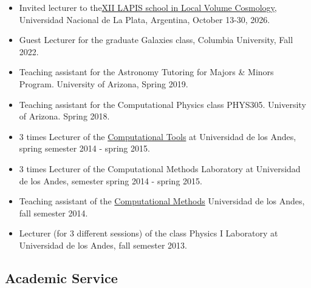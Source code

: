 \documentclass[14pt]{article}
\begin{document}
\begin{itemize}
  \setlength\itemsep{0.0em}
  \renewcommand\labelitemi{$\cdot$}
  \item Invited lecturer to the\href{https://congresos.unlp.edu.ar/xiilapis2026/home/}{XII LAPIS school in
    Local Volume Cosmology}, Universidad Nacional de La Plata, Argentina, October 13-30, 2026. 
\item Guest Lecturer for the graduate Galaxies class, Columbia University, Fall 2022.
\item Teaching assistant for the Astronomy Tutoring for Majors \& Minors Program. University of Arizona, Spring 2019. 
\item Teaching assistant for the Computational Physics class PHYS305. University of Arizona. Spring 2018.
\item 3 times Lecturer of the \href{https://github.com/ComputoCienciasUniandes/HerramientasComputacionales}{Computational
  Tools} at Universidad de los Andes, spring semester 2014 - spring 2015.
\item 3 times Lecturer of the Computational Methods Laboratory at Universidad de los Andes, semester spring 2014 - spring 2015.
\item Teaching assistant of the
  \href{https://github.com/ComputoCienciasUniandes/MetodosComputacionales}{Computational
  Methods} Universidad de los Andes, fall semester 2014.
\item Lecturer (for 3 different sessions) of the class Physics I Laboratory at Universidad de los Andes, fall semester 2013.
\end{itemize}


\subsection*{Academic Service} 
\end{document}
